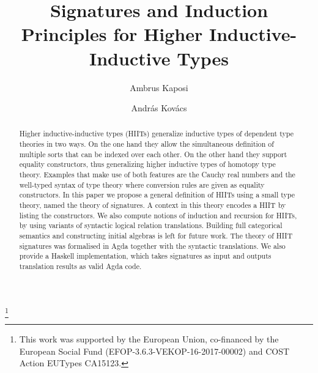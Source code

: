 \documentclass[dvipsnames]{lmcs} %
\newcommand{\1}{\mathsf{1}} \renewcommand{\Pr}{\mathsf{Pr}}
\theoremstyle{plain}\newtheorem{satz}[thm]{Satz} %
\begin{document}
\title{Signatures and Induction Principles for Higher Inductive-Inductive Types}

\author[A.~Kaposi]{Ambrus Kaposi}	%
\address{Department of Programming Languages and Compilers, E{\"o}tv{\"o}s Lor{\'a}nd University, Budapest, Hungary}	%

\author[A.~Kov{\'a}cs]{Andr{\'a}s Kov{\'a}cs}	%
\address{Department of Programming Languages and Compilers, E{\"o}tv{\"o}s Lor{\'a}nd University, Budapest, Hungary}	%
\thanks{This work was supported by the European Union, co-financed by the
European Social Fund (EFOP-3.6.3-VEKOP-16-2017-00002) and COST Action
EUTypes CA15123.}	%




\begin{abstract}
\noindent
Higher inductive-inductive types (HIITs) generalize inductive types of dependent
type theories in two ways. On the one hand they allow the simultaneous
definition of multiple sorts that can be indexed over each other. On the other
hand they support equality constructors, thus generalizing higher inductive
types of homotopy type theory. Examples that make use of both features are the
Cauchy real numbers and the well-typed syntax of type theory where conversion
rules are given as equality constructors. In this paper we propose a general
definition of HIITs using a small type theory, named the theory of signatures. A
context in this theory encodes a HIIT by listing the constructors. We also
compute notions of induction and recursion for HIITs, by using variants of
syntactic logical relation translations. Building full categorical semantics and
constructing initial algebras is left for future work. The theory of HIIT
signatures was formalised in Agda together with the syntactic translations. We
also provide a Haskell implementation, which takes signatures as input and
outputs translation results as valid Agda code.
\end{abstract}
\end{document}
